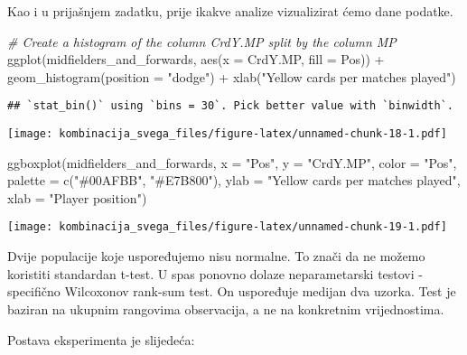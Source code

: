\documentclass[
]{article}
\newenvironment{Shaded}{\begin{snugshade}}{\end{snugshade}}
\newcommand{\AttributeTok}[1]{\textcolor[rgb]{0.77,0.63,0.00}{#1}}
\newcommand{\CommentTok}[1]{\textcolor[rgb]{0.56,0.35,0.01}{\textit{#1}}}
\newcommand{\FunctionTok}[1]{\textcolor[rgb]{0.00,0.00,0.00}{#1}}
\newcommand{\NormalTok}[1]{#1}
\newcommand{\SpecialCharTok}[1]{\textcolor[rgb]{0.00,0.00,0.00}{#1}}
\newcommand{\StringTok}[1]{\textcolor[rgb]{0.31,0.60,0.02}{#1}}
\begin{document}
Kao i u prijašnjem zadatku, prije ikakve analize vizualizirat ćemo dane
podatke.

\begin{Shaded}
\begin{Highlighting}[]
\CommentTok{\# Create a histogram of the column \textquotesingle{}CrdY.MP\textquotesingle{} split by the column \textquotesingle{}MP\textquotesingle{}}
\FunctionTok{ggplot}\NormalTok{(midfielders\_and\_forwards, }\FunctionTok{aes}\NormalTok{(}\AttributeTok{x =}\NormalTok{ CrdY.MP, }\AttributeTok{fill =}\NormalTok{ Pos)) }\SpecialCharTok{+}
  \FunctionTok{geom\_histogram}\NormalTok{(}\AttributeTok{position =} \StringTok{"dodge"}\NormalTok{) }\SpecialCharTok{+} \FunctionTok{xlab}\NormalTok{(}\StringTok{"Yellow cards per matches played"}\NormalTok{)}
\end{Highlighting}
\end{Shaded}

\begin{verbatim}
## `stat_bin()` using `bins = 30`. Pick better value with `binwidth`.
\end{verbatim}

\texttt{[image: kombinacija\_svega\_files/figure-latex/unnamed-chunk-18-1.pdf]}

\begin{Shaded}
\begin{Highlighting}[]
\FunctionTok{ggboxplot}\NormalTok{(midfielders\_and\_forwards, }\AttributeTok{x =} \StringTok{"Pos"}\NormalTok{, }\AttributeTok{y =} \StringTok{"CrdY.MP"}\NormalTok{, }
          \AttributeTok{color =} \StringTok{"Pos"}\NormalTok{, }\AttributeTok{palette =} \FunctionTok{c}\NormalTok{(}\StringTok{"\#00AFBB"}\NormalTok{, }\StringTok{"\#E7B800"}\NormalTok{),}
          \AttributeTok{ylab =} \StringTok{"Yellow cards per matches played"}\NormalTok{, }\AttributeTok{xlab =} \StringTok{"Player position"}\NormalTok{)}
\end{Highlighting}
\end{Shaded}

\texttt{[image: kombinacija\_svega\_files/figure-latex/unnamed-chunk-19-1.pdf]}

Dvije populacije koje uspoređujemo nisu normalne. To znači da ne možemo
koristiti standardan t-test. U spas ponovno dolaze neparametarski
testovi - specifično Wilcoxonov rank-sum test. On uspoređuje medijan dva
uzorka. Test je baziran na ukupnim rangovima observacija, a ne na
konkretnim vrijednostima.

Postava eksperimenta je slijedeća:
\end{document}
